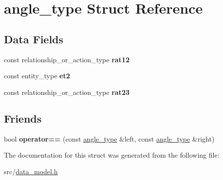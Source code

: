 \hypertarget{structangle__type}{}\section{angle\+\_\+type Struct Reference}
\label{structangle__type}
\subsection*{Data Fields}
\begin{DoxyCompactItemize}
\item 
const relationship\+\_\+or\+\_\+action\+\_\+type {\bfseries rat12}\hypertarget{structangle__type_a748f65a3ae97f3dba1cac69d40330f42}{}\label{structangle__type_a748f65a3ae97f3dba1cac69d40330f42}

\item 
const entity\+\_\+type {\bfseries et2}\hypertarget{structangle__type_a597582b9649e36a41e8f0a5e0ea50c66}{}\label{structangle__type_a597582b9649e36a41e8f0a5e0ea50c66}

\item 
const relationship\+\_\+or\+\_\+action\+\_\+type {\bfseries rat23}\hypertarget{structangle__type_ad98ed08839b6c50759ae01fb72338cb9}{}\label{structangle__type_ad98ed08839b6c50759ae01fb72338cb9}

\end{DoxyCompactItemize}
\subsection*{Friends}
\begin{DoxyCompactItemize}
\item 
bool {\bfseries operator==} (const \hyperlink{structangle__type}{angle\+\_\+type} \&left, const \hyperlink{structangle__type}{angle\+\_\+type} \&right)\hypertarget{structangle__type_a259cbf4e32421b1e65066025fa86e999}{}\label{structangle__type_a259cbf4e32421b1e65066025fa86e999}

\end{DoxyCompactItemize}


The documentation for this struct was generated from the following file\+:\begin{DoxyCompactItemize}
\item 
src/\hyperlink{data__model_8h}{data\+\_\+model.\+h}\end{DoxyCompactItemize}
